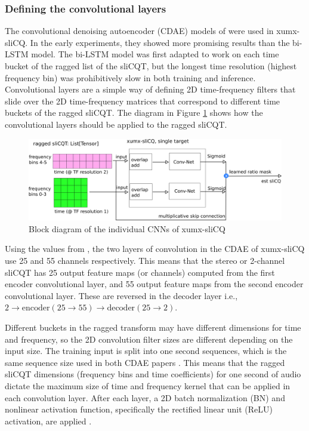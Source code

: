 \documentclass[report.tex]{subfiles}
\begin{document}
\subsubsection{Defining the convolutional layers}
\label{sec:convlayers}

The convolutional denoising autoencoder (CDAE) models of \textcite{plumbley1, plumbley2} were used in xumx-sliCQ. In the early experiments, they showed more promising results than the bi-LSTM model. The bi-LSTM model was first adapted to work on each time bucket of the ragged list of the sliCQT, but the longest time resolution (highest frequency bin) was prohibitively slow in both training and inference. Convolutional layers are a simple way of defining 2D time-frequency filters that slide over the 2D time-frequency matrices that correspond to different time buckets of the ragged sliCQT. The diagram in Figure \ref{fig:cdaeslicqt} shows how the convolutional layers should be applied to the ragged sliCQT.

\begin{figure}[ht]
	\centering
	\includegraphics[width=\textwidth]{./images-blockdiagrams/xumx_slicq_pertarget_largefont.png}
	\caption{Block diagram of the individual CNNs of xumx-sliCQ}
	\label{fig:cdaeslicqt}
\end{figure}

Using the values from \textcite{plumbley2}, the two layers of convolution in the CDAE of xumx-sliCQ use 25 and 55 channels respectively. This means that the stereo or 2-channel sliCQT has 25 output feature maps (or channels) computed from the first encoder convolutional layer, and 55 output feature maps from the second encoder convolutional layer. These are reversed in the decoder layer i.e., $2 \rightarrow \text{encoder}(25 \rightarrow 55) \rightarrow \text{decoder}(25 \rightarrow 2)$.

Different buckets in the ragged transform may have different dimensions for time and frequency, so the 2D convolution filter sizes are different depending on the input size. The training input is split into one second sequences, which is the same sequence size used in both CDAE papers \parencite{plumbley1, plumbley2}. This means that the ragged sliCQT dimensions (frequency bins and time coefficients) for one second of audio dictate the maximum size of time and frequency kernel that can be applied in each convolution layer. After each layer, a 2D batch normalization (BN) and nonlinear activation function, specifically the rectified linear unit (ReLU) activation, are applied \parencite{plumbley2}.
\end{document}

